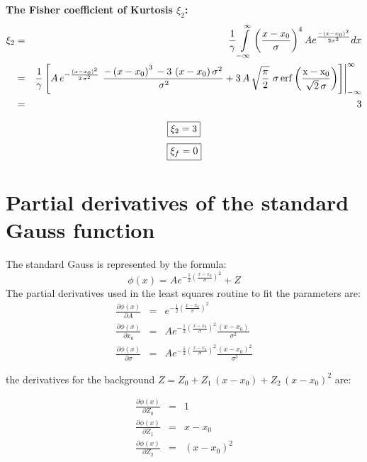 \documentclass[10pt,a4paper]{report}
\def\epow{A{e^{-\frac{1}{2} {\left(\frac{x - x_0}{\sigma}\right)}^2}}}
\def\erf{\rm erf}
\begin{document}
\begin{flushleft}
\vspace{1cm} 
{\bf The Fisher coefficient of Kurtosis $\xi_2$:} 
\begin{eqnarray*}
\xi_2 &=& \frac{1}{\gamma}\int\limits_{-\infty}^{\infty} \left({\frac{x-x_0}{\sigma}}\right)^{4}Ae^{\frac{-(x-x_0)^2}{2\sigma^2}}dx\\
&=& \frac{1}{\gamma} \left[ {A\,{e^{{-\frac{{{\left( x - x_0 \right) }^2}}
      {2\,{{\sigma }^2}}}}}\,\,
\frac{  {{-\left( x - x_0 \right)}^3}\, - 
       3\,\left( x - x_0 \right){{\sigma }^2} }{\,
     {{\sigma }^2}}} +
3\,A\,{\sqrt{{\frac{\pi }{2}}}}\,\,
   {\sigma}\,\erf \left({\frac
        {x - x_0} {{\sqrt{2}}\,
        \sigma }}\right) \right]
\Biggr|_{-\infty}^{\infty}\\
&=& 3
\end{eqnarray*}

\begin{equation}
\framebox{$\xi_2 = 3$}
\end{equation} 
\begin{equation}
\framebox{$\xi_f = 0$}
\end{equation} 


\section{Partial derivatives of the standard Gauss function}
The standard Gauss is represented by the formula:
$$\phi(x)=\epow + Z$$
The partial derivatives used in the least squares routine to fit the parameters
are:
\begin{eqnarray}
\frac{\partial\phi(x)}{\partial A} &=& e^{-\frac{1}{2} {\left(\frac{x - x_0}{\sigma}\right)}^2} \\
\frac{\partial\phi(x)}{\partial x_0} &=& \epow \frac{(x-x_0)}{\sigma^2}\\
\frac{\partial\phi(x)}{\partial \sigma} &=& \epow \frac{{(x-x_0)}^2}{\sigma^3} 
\end{eqnarray}

the derivatives for the background $Z = Z_0 + Z_1\, (x-x_0) + Z_2\, (x-x_0)^2$
are:

\begin{eqnarray}
\frac{\partial\phi(x)}{\partial Z_0} &=& 1\\
\frac{\partial\phi(x)}{\partial Z_1} &=& x - x_0\\ 
\frac{\partial\phi(x)}{\partial Z_2} &=& {(x - x_0)}^2\\
\end{eqnarray}




\end{flushleft}
\end{document}

